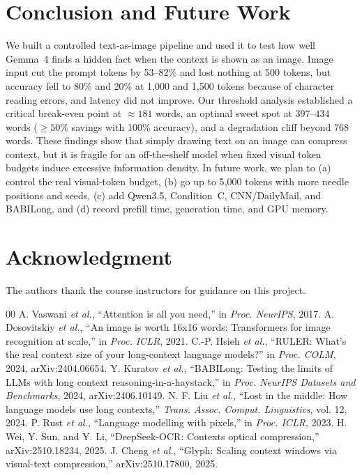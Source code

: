 \documentclass[conference]{IEEEtran}
\begin{document}
\section{Conclusion and Future Work}
\label{sec:conclusion}
We built a controlled text-as-image pipeline and used it to test how well Gemma~4 finds a hidden fact when the context is shown as an image. Image input cut the prompt tokens by 53--82\% and lost nothing at 500 tokens, but accuracy fell to 80\% and 20\% at 1{,}000 and 1{,}500 tokens because of character reading errors, and latency did not improve. Our threshold analysis established a critical break-even point at $\approx 181$ words, an optimal sweet spot at $397$--$434$ words ($\ge 50\%$ savings with 100\% accuracy), and a degradation cliff beyond 768 words. These findings show that simply drawing text on an image can compress context, but it is fragile for an off-the-shelf model when fixed visual token budgets induce excessive information density. In future work, we plan to (a) control the real visual-token budget, (b) go up to 5{,}000 tokens with more needle positions and seeds, (c) add Qwen3.5, Condition~C, CNN/DailyMail, and BABILong, and (d) record prefill time, generation time, and GPU memory.

\section*{Acknowledgment}
The authors thank the course instructors for guidance on this project.

\begin{thebibliography}{00}
 A. Vaswani \emph{et al.}, ``Attention is all you need,'' in \emph{Proc. NeurIPS}, 2017.
 A. Dosovitskiy \emph{et al.}, ``An image is worth 16x16 words: Transformers for image recognition at scale,'' in \emph{Proc. ICLR}, 2021.
 C.-P. Hsieh \emph{et al.}, ``RULER: What's the real context size of your long-context language models?'' in \emph{Proc. COLM}, 2024, arXiv:2404.06654.
 Y. Kuratov \emph{et al.}, ``BABILong: Testing the limits of LLMs with long context reasoning-in-a-haystack,'' in \emph{Proc. NeurIPS Datasets and Benchmarks}, 2024, arXiv:2406.10149.
 N. F. Liu \emph{et al.}, ``Lost in the middle: How language models use long contexts,'' \emph{Trans. Assoc. Comput. Linguistics}, vol. 12, 2024.
 P. Rust \emph{et al.}, ``Language modelling with pixels,'' in \emph{Proc. ICLR}, 2023.
 H. Wei, Y. Sun, and Y. Li, ``DeepSeek-OCR: Contexts optical compression,'' arXiv:2510.18234, 2025.
 J. Cheng \emph{et al.}, ``Glyph: Scaling context windows via visual-text compression,'' arXiv:2510.17800, 2025.
\end{thebibliography}
\end{document}

